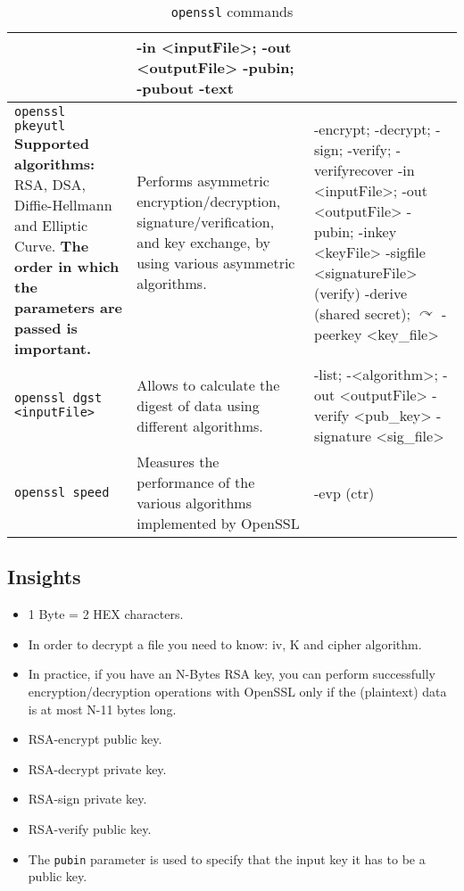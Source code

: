 \begin{table}[H]
\begin{tabular}{|p{6cm}|p{3cm}|p{7cm}|}
			& -in <inputFile>; -out <outputFile>
				\newline -pubin; -pubout
				\newline -text
			\\ \hline
		\texttt{openssl pkeyutl} 
			\newline\newline \textbf{Supported algorithms:} RSA, DSA, Diffie-Hellmann and Elliptic Curve. \textbf{The order in which the parameters are passed is important.}
			& Performs asymmetric encryption/decryption, signature/verification, and key exchange, by using various asymmetric algorithms.
			& -encrypt; -decrypt; -sign; 
				\newline -verify; -verifyrecover
				\newline -in <inputFile>; -out <outputFile>
				\newline -pubin; -inkey <keyFile>
				\newline -sigfile <signatureFile> (verify)
				\newline -derive (shared secret); \(\curvearrowright\) \newline -peerkey <key\_file>
			\\ \hline
		\texttt{openssl dgst <inputFile>} 
			& Allows to calculate the digest of data using different algorithms.  
			& -list; 
				\newline -<algorithm>; -out <outputFile>
				\newline -verify <pub\_key> 
				\newline -signature <sig\_file>
			\\ \hline
		\texttt{openssl speed} 
			& Measures the performance of the various algorithms implemented by OpenSSL
			& -evp (ctr)
			\\ \hline
    \end{tabular}

    \caption{\texttt{openssl} commands}

    \label{tab:openssl}
\end{table}

\clearpage
\subsection*{Insights}
\begin{itemize}
\item 1 Byte = 2 HEX characters. 
\item In order to decrypt a file you need to know: iv, K and cipher algorithm.
\item In practice, if you have an N-Bytes RSA key, you can perform successfully encryption/decryption operations with OpenSSL only if the (plaintext) data is at most N-11 bytes long.
\item RSA-encrypt \textrightarrow public key.
\item RSA-decrypt \textrightarrow private key.
\item RSA-sign \textrightarrow private key.
\item RSA-verify \textrightarrow public key.
\item The \texttt{pubin} parameter is used to specify that the input key it has to be a public key.
\end{itemize}

